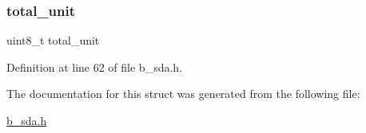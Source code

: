 \subsubsection{\texorpdfstring{total\+\_\+unit}{total\_unit}}
{\footnotesize\ttfamily uint8\+\_\+t total\+\_\+unit}



Definition at line 62 of file b\+\_\+sda.\+h.



The documentation for this struct was generated from the following file\+:\begin{DoxyCompactItemize}
\item 
\mbox{\hyperlink{b__sda_8h}{b\+\_\+sda.\+h}}\end{DoxyCompactItemize}
